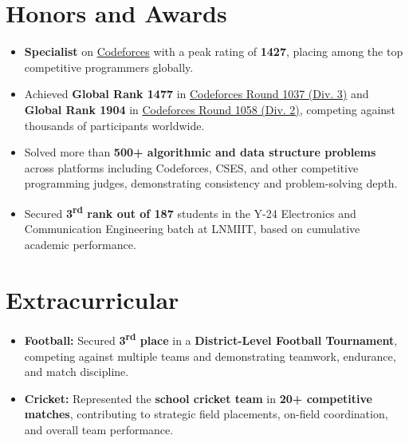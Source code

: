 \documentclass[a4paper,11pt]{article}
\newcommand{\resumeItem}[2]{
  \item\small{\textbf{#1:} #2 \vspace{-3pt}}
}
\newcommand{\resumeItemWithoutTitle}[1]{
  \item\small{#1 \vspace{-3pt}}
}
\newcommand{\resumeSubItem}[2]{\resumeItem{#1}{#2}\vspace{-3pt}}
\newcommand{\resumeSubHeadingListStart}{\begin{itemize}[leftmargin=*]}
\newcommand{\resumeSubHeadingListEnd}{\end{itemize}\vspace{1pt}}
\newcommand{\resumeItemListStart}{\begin{itemize}[leftmargin=1.5em, label=\textbullet]}
\newcommand{\resumeItemListEnd}{\end{itemize}\vspace{-5pt}}
\begin{document}
\section{Honors and Awards}
\resumeItemListStart
  \resumeItemWithoutTitle{\textbf{Specialist} on \href{https://codeforces.com/profile/roronoa_2z}{Codeforces} with a peak rating of \textbf{1427}, placing among the top competitive programmers globally.}
  
  \resumeItemWithoutTitle{Achieved \textbf{Global Rank 1477} in \href{https://codeforces.com/contest/2126}{Codeforces Round 1037 (Div. 3)} and \textbf{Global Rank 1904} in \href{https://codeforces.com/contest/2160}{Codeforces Round 1058 (Div. 2)}, competing against thousands of participants worldwide.}
  
  \resumeItemWithoutTitle{Solved more than \textbf{500+ algorithmic and data structure problems} across platforms including Codeforces, CSES, and other competitive programming judges, demonstrating consistency and problem-solving depth.}
  
  \resumeItemWithoutTitle{Secured \textbf{3\textsuperscript{rd} rank out of 187} students in the Y-24 Electronics and Communication Engineering batch at LNMIIT, based on cumulative academic performance.}
\resumeItemListEnd


\section{Extracurricular}
\resumeSubHeadingListStart
  \resumeSubItem{Football}{Secured \textbf{3\textsuperscript{rd} place} in a \textbf{District-Level Football Tournament}, competing against multiple teams and demonstrating teamwork, endurance, and match discipline.}
  
  \resumeSubItem{Cricket}{Represented the \textbf{school cricket team} in \textbf{20+ competitive matches}, contributing to strategic field placements, on-field coordination, and overall team performance.}
\resumeSubHeadingListEnd
\end{document}
